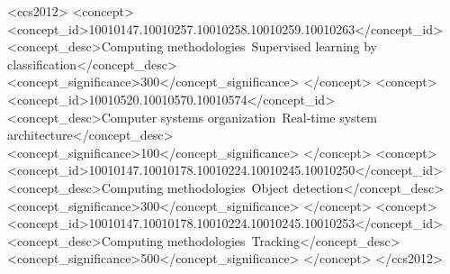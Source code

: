\documentclass[acmsmall]{acmart}
\begin{document}
\begin{CCSXML}
	<ccs2012>
	<concept>
	<concept_id>10010147.10010257.10010258.10010259.10010263</concept_id>
	<concept_desc>Computing methodologies~Supervised learning by classification</concept_desc>
	<concept_significance>300</concept_significance>
	</concept>
	<concept>
	<concept_id>10010520.10010570.10010574</concept_id>
	<concept_desc>Computer systems organization~Real-time system architecture</concept_desc>
	<concept_significance>100</concept_significance>
	</concept>
	<concept>
	<concept_id>10010147.10010178.10010224.10010245.10010250</concept_id>
	<concept_desc>Computing methodologies~Object detection</concept_desc>
	<concept_significance>300</concept_significance>
	</concept>
	<concept>
	<concept_id>10010147.10010178.10010224.10010245.10010253</concept_id>
	<concept_desc>Computing methodologies~Tracking</concept_desc>
	<concept_significance>500</concept_significance>
	</concept>
	</ccs2012>
\end{CCSXML}






\maketitle
\end{document}
